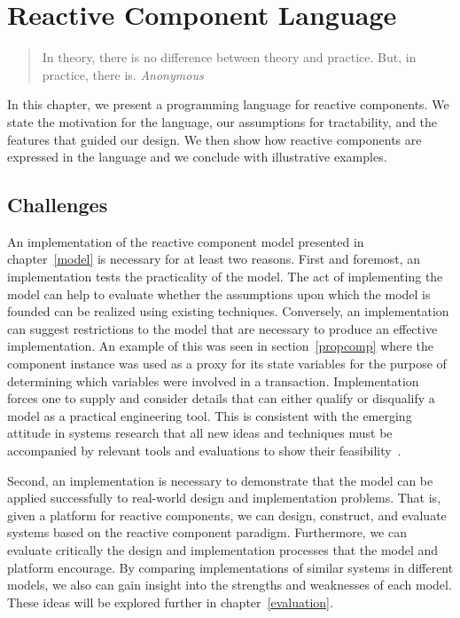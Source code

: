 \chapter{Reactive Component Language\label{language}}

\begin{quote}
In theory, there is no difference between theory and practice. \linebreak
But, in practice, there is.  \emph{Anonymous}
\end{quote}

In this chapter, we present a programming language for reactive components.
We state the motivation for the language, our assumptions for tractability, and the features that guided our design.
We then show how reactive components are expressed in the language and we conclude with illustrative examples.

\section{Challenges}
An implementation of the reactive component model presented in chapter~\ref{model} is necessary for at least two reasons.
First and foremost, an implementation tests the practicality of the model.
The act of implementing the model can help to evaluate whether the assumptions upon which the model is founded can be realized using existing techniques.
Conversely, an implementation can suggest restrictions to the model that are necessary to produce an effective implementation.
An example of this was seen in section~\ref{propcomp} where the component instance was used as a proxy for its state variables for the purpose of determining which variables were involved in a transaction.
Implementation forces one to supply and consider details that can either qualify or disqualify a model as a practical engineering tool.
This is consistent with the emerging attitude in systems research that all new ideas and techniques must be accompanied by relevant tools and evaluations to show their feasibility~\cite{Krishnamurthi:2015:RSC:2739250.2658987}.

Second, an implementation is necessary to demonstrate that the model can be applied successfully to real-world design and implementation problems.
That is, given a platform for reactive components, we can design, construct, and evaluate systems based on the reactive component paradigm.
Furthermore, we can evaluate critically the design and implementation processes that the model and platform encourage.
By comparing implementations of similar systems in different models, we also can gain insight into the strengths and weaknesses of each model.
These ideas will be explored further in chapter~\ref{evaluation}.

